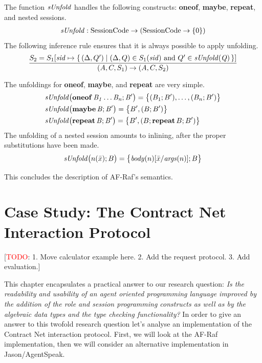\documentclass[a4paper,12pt,oneside,fleqn]{book} %
\newcommand{\todo}[1]{[\textcolor{red}{TODO}: #1]}
\begin{document}
The function $\it sUnfold$ handles the following constructs: {\bf oneof},
{\bf maybe}, {\bf repeat}, and nested sessions.
\begin{align}
{\it sUnfold} : {\rm SessionCode}\to({\rm SessionCode}\to\{0\})
\end{align}
The following inference rule ensures that it is always possible to apply
unfolding.
\begin{align}
\frac
  {S_2=S_1[{\it sid}\mapsto\{\,(\Delta,Q')
    \mid\text{$(\Delta,Q)\in S_1({\it sid})$ and $Q'\in{\it sUnfold(Q)}$}\,\}]}
  {(A,C,S_1)\to(A,C,S_2)}
\end{align}

The unfoldings for {\bf oneof}, {\bf maybe}, and {\bf repeat} are very
simple.
\begin{align}
&{\it sUnfold\bigl({\bf oneof}\,B_1\ldots B_n; B'\bigr)}
  = \bigl\{ (B_1;B'),\ldots,(B_n;B')\bigr\}
\\
&{\it sUnfold\bigl({\bf maybe}\,B;B'\bigr)}
  = \bigl\{ B', (B;B')\bigr\} \\
&{\it sUnfold\bigl({\bf repeat}\,B;B'\bigr)}
  = \bigl\{ B', (B;{\bf repeat}\,B;B')\bigr\}
\end{align}
The unfolding of a nested session amounts to inlining, after the proper
substitutions have been made.
\begin{align}
{\it sUnfold}\bigl(n(\bar{x}); B\bigr)
  = \bigl\{ {\it body}(n)[\bar{x}/{\it args}(n)]; B \bigr\}
\end{align}

This concludes the description of AF-Raf's semantics.


\chapter{Case Study: The Contract Net Interaction Protocol}\label{ch:casestudy} %

\todo{1. Move calculator example here. 2. Add the request protocol. 3. Add
evaluation.}

This chapter encapsulates a practical answer to our research question:
\textit{Is the readability and usability of an agent oriented programming
language improved by the addition of the role and session programming
constructs as well as by the algebraic data types and the type checking
functionality?} In order to give an answer to this twofold research
question let's analyse an implementation of the Contract Net interaction
protocol. First, we will look at the AF-Raf implementation, then we will
consider an alternative implementation in Jason/AgentSpeak.
\end{document}
